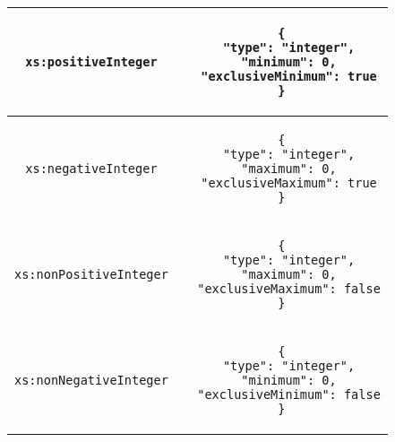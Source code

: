 \begin{longtable}{c|c}
\hline
\begin{minipage}{.4\textwidth}
  \begin{lstlisting}
xs:positiveInteger
  \end{lstlisting}
\end{minipage} &
\begin{minipage}{.55\textwidth}
\begin{lstlisting}
{
  "type": "integer",
  "minimum": 0,
  "exclusiveMinimum": true
}
\end{lstlisting}
\end{minipage}\\

\hline
\begin{minipage}{.4\textwidth}
  \begin{lstlisting}
xs:negativeInteger
  \end{lstlisting}
\end{minipage} &
\begin{minipage}{.55\textwidth}
\begin{lstlisting}
{
  "type": "integer",
  "maximum": 0,
  "exclusiveMaximum": true
}
\end{lstlisting}
\end{minipage}\\

\hline
\begin{minipage}{.4\textwidth}
  \begin{lstlisting}
xs:nonPositiveInteger
  \end{lstlisting}
\end{minipage} &
\begin{minipage}{.55\textwidth}
\begin{lstlisting}
{
  "type": "integer",
  "maximum": 0,
  "exclusiveMaximum": false
}
\end{lstlisting}
\end{minipage}\\

\hline
\begin{minipage}{.4\textwidth}
  \begin{lstlisting}
xs:nonNegativeInteger
  \end{lstlisting}
\end{minipage} &
\begin{minipage}{.55\textwidth}
\begin{lstlisting}
{
  "type": "integer",
  "minimum": 0,
  "exclusiveMinimum": false
}
\end{lstlisting}
\end{minipage}

\end{longtable}

\lstset{
  showstringspaces=false,
  frame=single,
  numbers=left,
  basicstyle=\ttfamily,
  numberstyle=\tiny
}